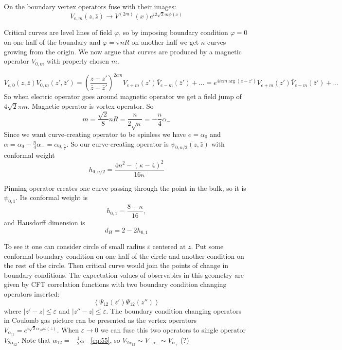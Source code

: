 \documentclass[12pt]{article}
\begin{document}
On the boundary vertex operators fuse with their images:
\begin{equation}
  \label{eq:144}
    V_{e,m}(z,\bar z)\to V^{(2m)}(x) e^{i 2\sqrt{2}m \phi(x)}
\end{equation}

Critical curves are level lines of field $\varphi$, so by imposing boundary condition $\varphi=0$
on one half of the boundary and $\varphi=\pi n R$ on another half we get $n$ curves growing from the
origin. We now argue that curves are produced by a magnetic operator $V_{0,m}$ with properly chosen
$m$. 

\begin{equation}
  \label{eq:145}
  V_{e,0}(z,\bar z)V_{0,m}(z',\bar z')=\left(\frac{z-z'}{\bar z-\bar z'}\right)^{2em}
  V_{e+m}(z')\bar V_{e-m}(\bar z')+\dots=e^{4i em \arg(z-z')} V_{e+m}(z')\bar V_{e-m}(\bar z')+\dots
\end{equation}
So when electric operator goes around magnetic operator we get a field jump of $4\sqrt{2}\pi m$.
Magnetic operator is vortex operator. So
\begin{equation}
  \label{eq:146}
  m=\frac{\sqrt{2}}{8}nR = \frac{n}{2\sqrt{\kappa}}=-\frac{n}{4} \alpha_{-}
\end{equation}
Since we want curve-creating operator to be spinless we have $e=\alpha_{0}$ and
$\alpha=\alpha_{0}-\frac{n}{4}\alpha_{-}=\alpha_{0,\frac{n}{2}}$. So our curve-creating operator is
$\psi_{0,n/2}(z,\bar z)$ with conformal weight
\begin{equation}
  \label{eq:147}
  h_{0,n/2}=\frac{4n^{2}-(\kappa-4)^{2}}{16\kappa}
\end{equation}

Pinning operator creates one curve passing through the point in the bulk, so it is $\psi_{0,1}$. Its
conformal weight is
\begin{equation}
  \label{eq:148}
  h_{0,1}=\frac{8-\kappa}{16},
\end{equation}
and Hausdorff dimension is
\begin{equation}
  \label{eq:149}
  d_{H}=2-2h_{0,1}
\end{equation}


To see it one can consider circle of small radius $\varepsilon$ centered at $z$. Put some conformal
boundary condition on one half of the circle and another condition on the rest of the circle. Then
critical curve would join the points of change in boundary conditions. The expectation values of
observables in this geometry are given by CFT correlation functions with two boundary condition
changing operators inserted:
\begin{equation}
  \label{eq:119}
  \left< \Psi_{12}(z')\Psi_{12}(z'')\right>
\end{equation}
where $|z'-z|\leq \varepsilon$ and $|z''-z|\leq \varepsilon$. The boundary condition changing
operators in Coulomb gas picture can be presented as the vertex operators
$V_{\alpha_{12}}=e^{i\sqrt{2}\alpha_{12}\varphi(z)}$. When $\varepsilon\to 0$ we can fuse this two
operators to single operator $V_{2\alpha_{12}}$. Note that $\alpha_{12}=-\frac{1}{2}\alpha_{-}$
\eqref{eq:55}, so $V_{2\alpha_{12}}\sim V_{-\alpha_{-}}\sim V_{\alpha_{+}}$ (?)
\end{document}
